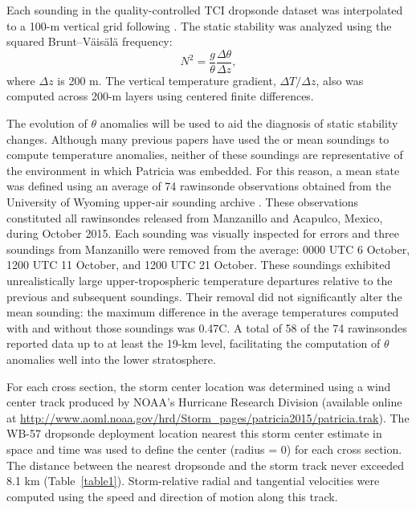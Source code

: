 Each sounding in the quality-controlled TCI dropsonde dataset \citep{BellTCI} was interpolated to a 100-m vertical grid following \cite{MolinariVollaro2010}.
The static stability was analyzed using the squared Brunt–V{\"a}is{\"a}l{\"a} frequency:
   \begin{equation} \label{eq:n2dry}
   N^2 = \frac{g}{\theta}\frac{\Delta \theta}{\Delta z},
   \end{equation}
where $\Delta z$ is 200 m.
The vertical temperature gradient, $\Delta T/\Delta z$, also was computed across 200-m layers using centered finite differences.

The evolution of $\theta$ anomalies will be used to aid the diagnosis of static stability changes.
Although many previous papers have used the \cite{Jordan1958} or \cite{Dunion2011} mean soundings to compute temperature anomalies, neither of these soundings are representative of the environment in which Patricia was embedded.
For this reason, a mean state was defined using an average of 74 rawinsonde observations obtained from the University of Wyoming upper-air sounding archive \citep{Wyoming2016}.
These observations constituted all rawinsondes released from Manzanillo and Acapulco, Mexico, during October 2015. Each sounding was visually inspected for errors and three soundings from Manzanillo were removed from the average: 0000 UTC 6 October, 1200 UTC 11 October, and 1200 UTC 21 October.
These soundings exhibited unrealistically large upper-tropospheric temperature departures relative to the previous and subsequent soundings.
Their removal did not significantly alter the mean sounding: the maximum difference in the average temperatures computed with and without those soundings was 0.47\textdegree{}C. 
A total of 58 of the 74 rawinsondes reported data up to at least the 19-km level, facilitating the computation of $\theta$ anomalies well into the lower stratosphere.

For each cross section, the storm center location was determined using a wind center track produced by NOAA’s Hurricane Research Division (available online at \url{http://www.aoml.noaa.gov/hrd/Storm_pages/patricia2015/patricia.trak}).
The WB-57 dropsonde deployment location nearest this storm center estimate in space and time was used to define the center (radius = 0) for each cross section.
The distance between the nearest dropsonde and the storm track never exceeded 8.1 km (Table~\ref{table1}).
Storm-relative radial and tangential velocities were computed using the speed and direction of motion along this track.

